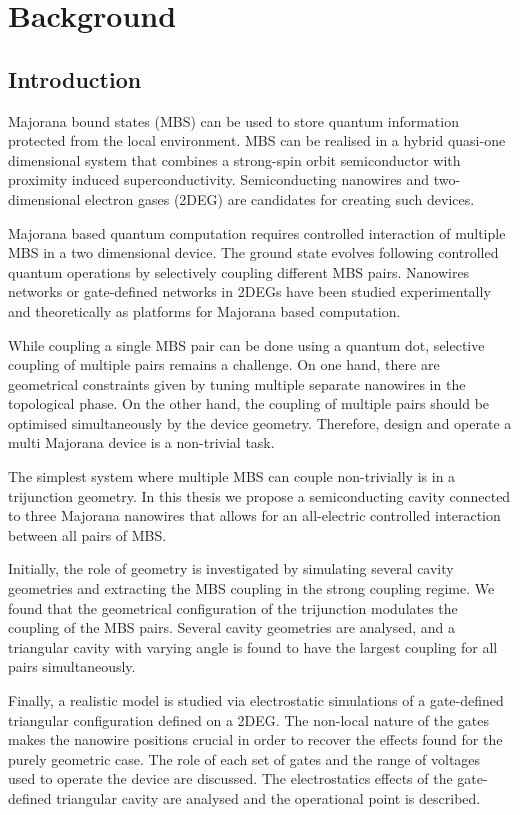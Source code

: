 \chapter{Background}

\section{Introduction}

Majorana bound states (MBS) can be used to store quantum information protected from the local environment.
MBS can be realised in a hybrid quasi-one dimensional system that combines a strong-spin orbit semiconductor with proximity induced superconductivity.
Semiconducting nanowires and two-dimensional electron gases (2DEG) are candidates for creating such devices.

Majorana based quantum computation requires controlled interaction of multiple MBS in a two dimensional device.
The ground state evolves following controlled quantum operations by selectively coupling different MBS pairs.
Nanowires networks or gate-defined networks in 2DEGs have been studied experimentally and theoretically as platforms for Majorana based computation.

While coupling a single MBS pair can be done using a quantum dot, selective coupling of multiple pairs remains a challenge.
On one hand, there are geometrical constraints given by tuning multiple separate nanowires in the topological phase.
On the other hand, the coupling of multiple pairs should be optimised simultaneously by the device geometry.
Therefore, design and operate a multi Majorana device is a non-trivial task.
 
The simplest system where multiple MBS can couple non-trivially is in a trijunction geometry.
In this thesis we propose a semiconducting cavity connected to three Majorana nanowires that allows for an all-electric controlled interaction between all pairs of MBS.

Initially, the role of geometry is investigated by simulating several cavity geometries and extracting the MBS coupling in the strong coupling regime.
We found that the geometrical configuration of the trijunction modulates the coupling of the MBS pairs.
Several cavity geometries are analysed, and a triangular cavity with varying angle is found to have the largest coupling for all pairs simultaneously.

Finally, a realistic model is studied via electrostatic simulations of a gate-defined triangular configuration defined on a 2DEG.
The non-local nature of the gates makes the nanowire positions crucial in order to recover the effects found for the purely geometric case.
The role of each set of gates and the range of voltages used to operate the device are discussed.
The electrostatics effects of the gate-defined triangular cavity are analysed and the operational point is described.


